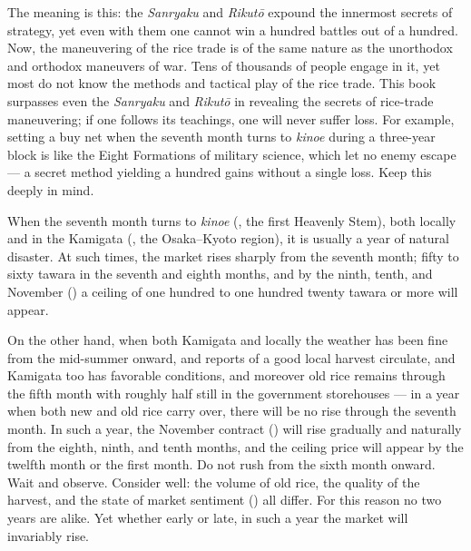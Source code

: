 The meaning is this: the \textit{Sanryaku} and \textit{Rikut\=o} expound the
innermost secrets of strategy, yet even with them one cannot win a
hundred battles out of a hundred. Now, the maneuvering of the rice
trade is of the same nature as the unorthodox and orthodox
maneuvers of war. Tens of thousands of people engage in it, yet most
do not know the methods and tactical play of the rice trade. This
book surpasses even the \textit{Sanryaku} and \textit{Rikut\=o} in revealing the
secrets of rice-trade maneuvering; if one follows its teachings, one
will never suffer loss. For example, setting a buy net when the
seventh month turns to \textit{kinoe} during a three-year block is like the
Eight Formations of military science, which let no enemy escape --- a
secret method yielding a hundred gains without a single loss. Keep
this deeply in mind.


\begin{sokyubox}
{\small\itshape\color{sokyubar} }

\medskip
When the seventh month turns to \textit{kinoe} (, the first Heavenly
Stem), both locally and in the Kamigata (, the
Osaka--Kyoto region), it is usually a year of natural disaster. At
such times, the market rises sharply from the seventh month; fifty
to sixty tawara in the seventh and eighth months, and by the ninth,
tenth, and November () a ceiling of one hundred
to one hundred twenty tawara or more will appear.

On the other hand, when both Kamigata and locally the weather has
been fine from the mid-summer  onward, and reports of
a good local harvest circulate, and Kamigata too has favorable
conditions, and moreover old rice remains through the fifth month
with roughly half still in the government storehouses --- in a year
when both new and old rice carry over, there will be no
rise through the seventh month. In such a year, the November contract
() will rise gradually and naturally from
the eighth, ninth, and tenth months, and the ceiling price will
appear by the twelfth month or the first month. Do not rush from the
sixth month onward. Wait and observe. Consider well: the volume of
old rice, the quality of the harvest, and the state of market
sentiment () all differ. For this reason no two years
are alike. Yet whether early or late, in such a year the market will
invariably rise.
\end{sokyubox}

